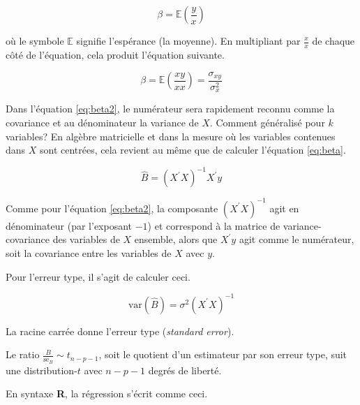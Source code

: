 \documentclass[
]{book}
\newcommand{\EX}{\mathbb{E}}
\begin{document}
\[
\beta = \EX(\frac{y}{x})
\]

où le symbole \(\EX\) signifie l'espérance (la moyenne). En multipliant par \(\frac{x}{x}\) de chaque côté de l'équation, cela produit l'équation suivante.

\begin{equation}
\beta = \EX(\frac{xy}{xx}) = \frac{\sigma_{xy}}{\sigma^2_x}
\label{eq:beta2}
\end{equation}

Dans l'équation \eqref{eq:beta2}, le numérateur sera rapidement reconnu comme la covariance et au dénominateur la variance de \(X\). Comment généralisé pour \(k\) variables? En algèbre matricielle et dans la mesure où les variables contenues dans \(X\) sont centrées, cela revient au même que de calculer l'équation \eqref{eq:beta}.

\begin{equation}
\hat{B} = (X^{\prime} X)^{-1} X^{\prime} y
\label{eq:beta}
\end{equation}

Comme pour l'équation \eqref{eq:beta2}, la composante \((X^{\prime} X)^{-1}\) agit en dénominateur (par l'exposant \(-1\)) et correspond à la matrice de variance-covariance des variables de \(X\) ensemble, alors que \(X^{\prime} y\) agit comme le numérateur, soit la covariance entre les variables de \(X\) avec \(y\).

Pour l'erreur type, il s'agit de calculer ceci.

\begin{equation}
\text{var}(\hat{B}) = \sigma^2 \left(X^{\prime}X\right)^{-1}
\end{equation}

La racine carrée donne l'erreur type (\emph{standard error}).

Le ratio \(\frac{B}{\text{se}_B} \sim t_{n-p-1}\), soit le quotient d'un estimateur par son erreur type, suit une distribution-\(t\) avec \(n-p-1\) degrés de liberté.

En syntaxe \textbf{R}, la régression s'écrit comme ceci.
\end{document}
